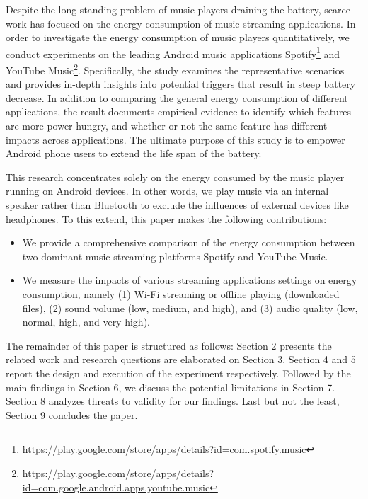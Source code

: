 Despite the long-standing problem of music players draining the battery, scarce work has focused on the energy consumption of music streaming applications. In order to investigate the energy consumption of music players quantitatively, we conduct experiments on the leading Android music applications Spotify\footnote{\label{note1}\href{ https://play.google.com/store/apps/details?id=com.spotify.music}{https://play.google.com/store/apps/details?id=com.spotify.music}} and YouTube Music\footnote{\label{note1}\href{ https://play.google.com/store/apps/details?id=com.google.android.apps.youtube.music}{https://play.google.com/store/apps/details?id=com.google.android.apps.youtube.music}}. Specifically, the study examines the representative scenarios and provides in-depth insights into potential triggers that result in steep battery decrease. In addition to comparing the general energy consumption of different applications, the result documents empirical evidence to identify which features are more power-hungry, and whether or not the same feature has different impacts across applications. The ultimate purpose of this study is to empower Android phone users to extend the life span of the battery. 

This research concentrates solely on the energy consumed by the music player running on Android devices. In other words, we play music via an internal speaker rather than Bluetooth to exclude the influences of external devices like headphones. To this extend, this paper makes the following contributions: 
\begin{itemize}
\item We provide a comprehensive comparison of the energy consumption between two dominant music streaming platforms Spotify and YouTube Music. 
\item We measure the impacts of various streaming applications settings on energy consumption, namely (1) Wi-Fi streaming or offline playing (\ie downloaded files), {\color{blue}(2) sound volume (\ie low, medium, and high)}, and (3) audio quality (\ie low, normal, high, and very high). 
\end{itemize}

The remainder of this paper is structured as follows: Section 2 presents the related work and research questions are elaborated on Section 3. Section 4 and 5 report the design and execution of the experiment respectively. Followed by the main findings in Section 6, we discuss the potential limitations in Section 7. Section 8 analyzes threats to validity for our findings. Last but not the least, Section 9 concludes the paper. 

